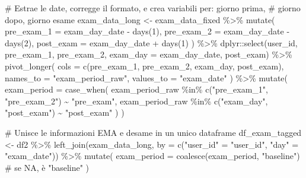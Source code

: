 \documentclass[
  11pt,
  a4paper,
  onecolumn]{article}
\newenvironment{Shaded}{}{}
\newcommand{\AttributeTok}[1]{\textcolor[rgb]{0.84,0.23,0.29}{#1}}
\newcommand{\CommentTok}[1]{\textcolor[rgb]{0.42,0.45,0.49}{#1}}
\newcommand{\DecValTok}[1]{\textcolor[rgb]{0.00,0.36,0.77}{#1}}
\newcommand{\FunctionTok}[1]{\textcolor[rgb]{0.44,0.26,0.76}{#1}}
\newcommand{\NormalTok}[1]{\textcolor[rgb]{0.14,0.16,0.18}{#1}}
\newcommand{\OtherTok}[1]{\textcolor[rgb]{0.44,0.26,0.76}{#1}}
\newcommand{\SpecialCharTok}[1]{\textcolor[rgb]{0.00,0.36,0.77}{#1}}
\newcommand{\StringTok}[1]{\textcolor[rgb]{0.01,0.18,0.38}{#1}}
\begin{document}
\begin{Shaded}
\begin{Highlighting}[]
\CommentTok{\# Estrae le date, corregge il formato, e crea variabili per: giorno prima, }
\CommentTok{\# giorno dopo, giorno esame}
\NormalTok{exam\_data\_long }\OtherTok{\textless{}{-}}\NormalTok{ exam\_data\_fixed }\SpecialCharTok{\%\textgreater{}\%}
  \FunctionTok{mutate}\NormalTok{(}
    \AttributeTok{pre\_exam\_1 =}\NormalTok{ exam\_day\_date }\SpecialCharTok{{-}} \FunctionTok{days}\NormalTok{(}\DecValTok{1}\NormalTok{),}
    \AttributeTok{pre\_exam\_2 =}\NormalTok{ exam\_day\_date }\SpecialCharTok{{-}} \FunctionTok{days}\NormalTok{(}\DecValTok{2}\NormalTok{),}
    \AttributeTok{post\_exam =}\NormalTok{ exam\_day\_date }\SpecialCharTok{+} \FunctionTok{days}\NormalTok{(}\DecValTok{1}\NormalTok{)}
\NormalTok{  ) }\SpecialCharTok{\%\textgreater{}\%}
\NormalTok{  dplyr}\SpecialCharTok{::}\FunctionTok{select}\NormalTok{(user\_id, pre\_exam\_1, pre\_exam\_2, }\AttributeTok{exam\_day =}\NormalTok{ exam\_day\_date, post\_exam) }\SpecialCharTok{\%\textgreater{}\%}
  \FunctionTok{pivot\_longer}\NormalTok{(}
    \AttributeTok{cols =} \FunctionTok{c}\NormalTok{(pre\_exam\_1, pre\_exam\_2, exam\_day, post\_exam),}
    \AttributeTok{names\_to =} \StringTok{"exam\_period\_raw"}\NormalTok{,}
    \AttributeTok{values\_to =} \StringTok{"exam\_date"}
\NormalTok{  ) }\SpecialCharTok{\%\textgreater{}\%}
  \FunctionTok{mutate}\NormalTok{(}
    \AttributeTok{exam\_period =} \FunctionTok{case\_when}\NormalTok{(}
\NormalTok{      exam\_period\_raw }\SpecialCharTok{\%in\%} \FunctionTok{c}\NormalTok{(}\StringTok{"pre\_exam\_1"}\NormalTok{, }\StringTok{"pre\_exam\_2"}\NormalTok{) }\SpecialCharTok{\textasciitilde{}} \StringTok{"pre\_exam"}\NormalTok{,}
\NormalTok{      exam\_period\_raw }\SpecialCharTok{\%in\%} \FunctionTok{c}\NormalTok{(}\StringTok{"exam\_day"}\NormalTok{, }\StringTok{"post\_exam"}\NormalTok{) }\SpecialCharTok{\textasciitilde{}} \StringTok{"post\_exam"}
\NormalTok{    )}
\NormalTok{  )}
\end{Highlighting}
\end{Shaded}

\begin{Shaded}
\begin{Highlighting}[]
\CommentTok{\# Unisce le informazioni EMA e d\textquotesingle{}esame in un unico dataframe}
\NormalTok{df\_exam\_tagged }\OtherTok{\textless{}{-}}\NormalTok{ df2 }\SpecialCharTok{\%\textgreater{}\%}
  \FunctionTok{left\_join}\NormalTok{(exam\_data\_long, }
            \AttributeTok{by =} \FunctionTok{c}\NormalTok{(}\StringTok{"user\_id"} \OtherTok{=} \StringTok{"user\_id"}\NormalTok{, }\StringTok{"day"} \OtherTok{=} \StringTok{"exam\_date"}\NormalTok{)) }\SpecialCharTok{\%\textgreater{}\%}
  \FunctionTok{mutate}\NormalTok{(}
    \AttributeTok{exam\_period =} \FunctionTok{coalesce}\NormalTok{(exam\_period, }\StringTok{"baseline"}\NormalTok{)  }\CommentTok{\# se NA, è "baseline"}
\NormalTok{  )}
\end{Highlighting}
\end{Shaded}
\end{document}
